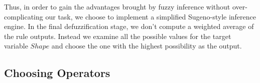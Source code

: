 Thus, in order to gain the advantages brought by fuzzy inference without over-complicating our task, we choose to implement a simplified Sugeno-style inference engine. In the final defuzzification stage, we don't compute a weighted average of the rule outputs. Instead we examine all the possible values for the target variable $Shape$ and choose the one with the highest possibility as the output.

\subsection{Choosing Operators}